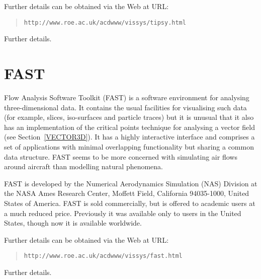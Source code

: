 \documentclass[twoside,11pt]{article}
\newcommand{\htmladdnormallink}[2]{#1}
\newenvironment{latexonly}{}{}
\newcommand{\xlabel}[1]{}
\begin{document}
\begin{latexonly}
Further details can be obtained via the Web at URL:

\begin{quote}
{\tt http://www.roe.ac.uk/acdwww/vissys/tipsy.html}
\end{quote}
\end{latexonly}

\begin{htmlonly}
\htmladdnormallink{Further details}
{http://www.roe.ac.uk/acdwww/vissys/tipsy.html}.
\end{htmlonly}


\section{FAST \label{FAST} \xlabel{FAST} }

Flow Analysis Software Toolkit (FAST) is a software environment for
analysing three-dimensional data. It contains the usual facilities for
visualising such data (for example, slices, iso-surfaces and particle
traces) but it is unusual that it also has an implementation of the
critical points technique for analysing a vector field (see
Section~\ref{VECTOR3D}). It has a highly interactive interface and
comprises a set of applications with minimal overlapping functionality
but sharing a common data structure. FAST seems to be more concerned
with simulating air flows around aircraft than modelling natural
phenomena.

FAST is developed by the Numerical Aerodynamics Simulation (NAS)
Division at the NASA Ames Research Center, Moffett Field, California
94035-1000, United States of America. FAST is sold commercially, but is
offered to academic users at a much reduced price. Previously it was
available only to users in the United States, though now it is available
worldwide.

\begin{latexonly}
Further details can be obtained via the Web at URL:

\begin{quote}
{\tt http://www.roe.ac.uk/acdwww/vissys/fast.html}
\end{quote}
\end{latexonly}

\begin{htmlonly}
\htmladdnormallink{Further details}
{http://www.roe.ac.uk/acdwww/vissys/fast.html}.
\end{htmlonly}


\end{document}
